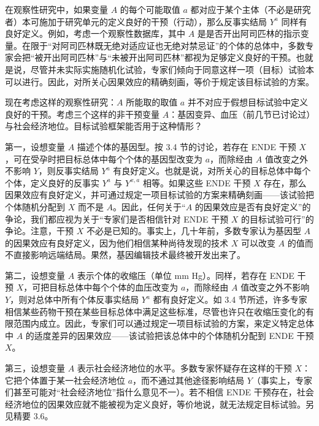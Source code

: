 在观察性研究中，如果变量 $A$ 的每个可能取值 $a$ 都对应于某个主体（不必是研究者）本可施加于研究单元的定义良好的干预（行动），那么反事实结局 $Y^{a}$ 同样有良好定义。例如，考虑一个观察性数据库，其中 $A$ 是是否开出阿司匹林的指示变量。在限于“对阿司匹林既无绝对适应证也无绝对禁忌证”的个体的总体中，多数专家会把“被开出阿司匹林”与“未被开出阿司匹林”都视为足够定义良好的干预。也就是说，尽管并未实际实施随机化试验，专家们倾向于同意这样一项（目标）试验本可以进行。因此，对所关心因果效应的精确刻画，等价于规定该目标试验的方案。

现在考虑这样的观察性研究：$A$ 所能取的取值 $a$ 并不对应于假想目标试验中定义良好的干预。考虑三个这样的非干预变量 $A$：基因变异、血压（前几节已讨论过）与社会经济地位。目标试验框架能否用于这种情形？


第一，设想变量 $A$ 描述个体的基因型。按 3.4 节的讨论，若存在 ENDE 干预 $X$，可在受孕时把目标总体中每个个体的基因型改变为 $a$，而除经由 $A$ 值改变之外不影响 $Y$，则反事实结局 $Y^{a}$ 有良好定义。也就是说，对所关心的目标总体中每个个体，定义良好的反事实 $Y^{a}$ 与 $Y^{x,a}$ 相等。如果这些 ENDE 干预 $X$ 存在，那么因果效应有良好定义，并可通过规定一项目标试验的方案来精确刻画——该试验把个体随机分配到 $X$ 而不是 $A$。因此，任何关于“$A$ 的因果效应是否有良好定义”的争论，我们都应视为关于“专家们是否相信针对 ENDE 干预 $X$ 的目标试验可行”的争论。注意，干预 $X$ 不必是已知的。事实上，几十年前，多数专家认为基因型 $A$ 的因果效应有良好定义，因为他们相信某种尚待发现的技术 $X$ 可以改变 $A$ 的值而不直接影响远端结局。果然，基因编辑技术最终被开发出来了。

第二，设想变量 $A$ 表示个体的收缩压（单位 mm Hg）。同样，若存在 ENDE 干预 $X$，可把目标总体中每个个体的血压改变为 $a$，而除经由 $A$ 值改变之外不影响 $Y$，则对总体中所有个体反事实结局 $Y^{a}$ 都有良好定义。如 3.4 节所述，许多专家相信某些药物干预在某些目标总体中满足这些标准，尽管也许只在收缩压变化的有限范围内成立。因此，专家们可以通过规定一项目标试验的方案，来定义特定总体中 $A$ 的适度差异的因果效应——该试验把该总体中的个体随机分配到 ENDE 干预 $X$。

第三，设想变量 $A$ 表示社会经济地位的水平。多数专家怀疑存在这样的干预 $X$：它把个体置于某一社会经济地位 $a$，而不通过其他途径影响结局 $Y$（事实上，专家们甚至可能对“社会经济地位”指什么意见不一）。若不相信 ENDE 干预存在，社会经济地位的因果效应就不能被视为定义良好，等价地说，就无法规定目标试验。另见精要 3.6。

